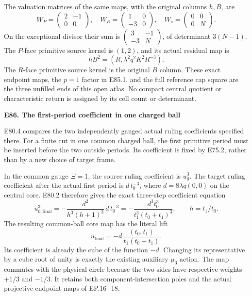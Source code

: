 The valuation matrices of the same maps, with the
original columns \(h,B\), are
\[
 W_P=\begin{pmatrix}2&-1\\0&0\end{pmatrix},\quad
 W_R=\begin{pmatrix}1&0\\-3&0\end{pmatrix},\quad
 W_s=\begin{pmatrix}0&0\\0&N\end{pmatrix}.
\]
On the exceptional divisor their sum is
\(\left(\begin{smallmatrix}3&-1\\-3&N\end{smallmatrix}\right)\),
of determinant \(3(N-1)\).
The \(P\)-face primitive source kernel is \((1,2)\),
and its actual residual map is
\[
                   hB^2=(R,\lambda^2q^2K^2R^{-3}).            \tag{E85.4}
\]
The \(R\)-face primitive source kernel is the original
\(B\) column. These exact endpoint maps, the
\(p=1\) factor in E85.1, and the full reference cap
square are the three unfilled ends of this open
atlas. No compact central quotient or characteristic
return is assigned by its cell count or determinant.

\par

\medskip\noindent\textbf{E86. The first-period coefficient in one charged ball}

\par\nobreak

E80.4 compares the two independently gauged actual ruling
coefficients specified there. For a finite cut in one common
charged ball, the first primitive period must be inserted
before the two outside periods. Its coefficient is fixed by
E75.2, rather than by a new choice of target frame.

In the common gauge \(\Xi=1\), the source ruling coefficient
is \(u_0^3\). The target ruling coefficient after the actual
first period is \(d\,t_0^{-3}\), where
\(d=8\lambda q(0,0)\) on the central core. E80.2 therefore
gives the exact three-step coefficient equation
\[
 u_{0,\mathrm{final}}^3
 =-\frac{d^2}{h^3(h+1)^3}\,d\,t_0^{-3}
 =-\frac{d^3t_0^3}{t_1^3(t_0+t_1)^3},\qquad h=t_1/t_0.
 \tag{E86.1}
\]
The resulting common-ball core map has the literal lift
\[
 u_{\mathrm{final}}
       =-d\,\frac{(t_0,t_1)}{t_1(t_0+t_1)}.
 \tag{E86.2}
\]
Its coefficient is already the cube of the function \(-d\).
Changing its representative by a cube root of unity is
exactly the existing auxiliary \(\mu_3\) action. The map
commutes with the physical circle because the two sides
have respective weights \(+1/3\) and \(-1/3\). It retains
both component-intersection poles and the actual projective
endpoint maps of EP.16-\/-18.

